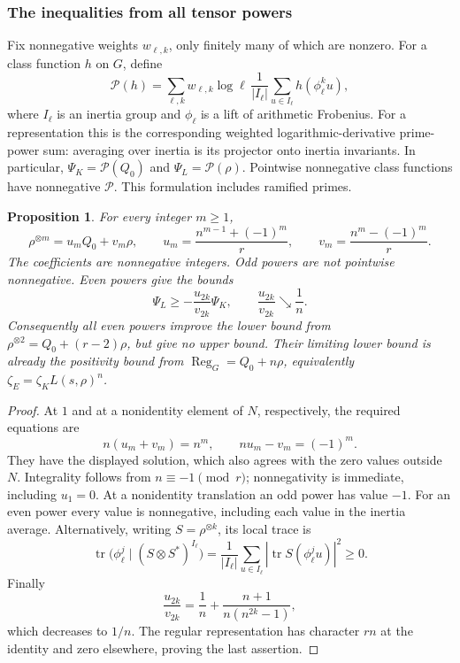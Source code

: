 \documentclass[11pt]{article}
\newtheorem{proposition}[theorem]{Proposition}
\theoremstyle{definition}
\theoremstyle{remark}
\begin{document}
\subsubsection{The inequalities from all tensor powers}

Fix nonnegative weights \(w_{\ell,k}\), only finitely many of which
are nonzero. For a class function \(h\) on \(G\), define
\[
 \mathcal P(h)=
 \sum_{\ell,k}w_{\ell,k}\log\ell\,
 \frac1{|I_\ell|}\sum_{u\in I_\ell}
 h(\phi_\ell^k u),
\]
where \(I_\ell\) is an inertia group and \(\phi_\ell\) is a lift of
arithmetic Frobenius. For a representation this is the corresponding
weighted logarithmic-derivative prime-power sum: averaging over inertia
is its projector onto inertia invariants. In particular,
\(\Psi_K=\mathcal P(Q_0)\) and \(\Psi_L=\mathcal P(\rho)\).
Pointwise nonnegative class functions have nonnegative \(\mathcal P\).
This formulation includes ramified primes.

\begin{proposition}\label{prop:all-tensor-powers}\label{prop:kummer-tensor-powers}
For every integer \(m\geq1\),
\begin{equation}\label{eq:all-tensor-powers}
 \rho^{\otimes m}=u_m Q_0+v_m\rho,\qquad
 u_m=\frac{n^{m-1}+(-1)^m}{r},\qquad
 v_m=\frac{n^m-(-1)^m}{r}.
\end{equation}
The coefficients are nonnegative integers. Odd powers are not
pointwise nonnegative. Even powers give the bounds
\[
 \Psi_L\geq-\frac{u_{2k}}{v_{2k}}\Psi_K,\qquad
 \frac{u_{2k}}{v_{2k}}\searrow\frac1n.
\]
Consequently all even powers improve the lower bound from
\(\rho^{\otimes2}=Q_0+(r-2)\rho\), but give no upper bound.
Their limiting lower bound is already the positivity bound from
\(\operatorname{Reg}_G=Q_0+n\rho\), equivalently
\(\zeta_E=\zeta_K L(s,\rho)^n\).
\end{proposition}

\begin{proof}
At \(1\) and at a nonidentity element of \(N\), respectively, the
required equations are
\[
 n(u_m+v_m)=n^m,\qquad nu_m-v_m=(-1)^m.
\]
They have the displayed solution, which also agrees with the zero
values outside \(N\). Integrality follows from \(n\equiv-1\pmod r\);
nonnegativity is immediate, including \(u_1=0\).
At a nonidentity translation an odd power has value \(-1\).
For an even power every value is nonnegative, including each value
in the inertia average. Alternatively, writing
\(S=\rho^{\otimes k}\), its local trace is
\[
 \operatorname{tr}\bigl(\phi_\ell^j\mid
                  (S\otimes S^*)^{I_\ell}\bigr)
 =\frac1{|I_\ell|}\sum_{u\in I_\ell}
       |\operatorname{tr}S(\phi_\ell^j u)|^2\geq0.
\]
Finally
\[
 \frac{u_{2k}}{v_{2k}}
 =\frac1n+\frac{n+1}{n(n^{2k}-1)},
\]
which decreases to \(1/n\). The regular representation has character
\(rn\) at the identity and zero elsewhere, proving the last assertion.
\end{proof}
\end{document}
